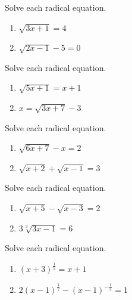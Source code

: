 \documentclass[en,12pt]{elegantbook}
\providecommand{\tightlist}{%
  \setlength{\itemsep}{0pt}\setlength{\parskip}{0pt}}
\providecommand{\tightlist}{%
  \setlength{\itemsep}{0pt}\setlength{\parskip}{0pt}}
\let\BeginKnitrBlock\begin \let\EndKnitrBlock\end
\begin{document}
\BeginKnitrBlock{exercise}
\protect\hypertarget{exr:unnamed-chunk-168}{}{\label{exr:unnamed-chunk-168} }
Solve each radical equation.

\begin{enumerate}
\def\labelenumi{\arabic{enumi}.}
\tightlist
\item
  \(\sqrt{3x+1}=4\)
\item
  \(\sqrt{2x-1}-5=0\)
\end{enumerate}
\EndKnitrBlock{exercise}

\BeginKnitrBlock{exercise}
\protect\hypertarget{exr:unnamed-chunk-169}{}{\label{exr:unnamed-chunk-169} }
Solve each radical equation.

\begin{enumerate}
\def\labelenumi{\arabic{enumi}.}
\tightlist
\item
  \(\sqrt{5x+1}=x+1\)
\item
  \(x=\sqrt{3x+7}-3\)
\end{enumerate}
\EndKnitrBlock{exercise}

\BeginKnitrBlock{exercise}
\protect\hypertarget{exr:unnamed-chunk-170}{}{\label{exr:unnamed-chunk-170} }
Solve each radical equation.

\begin{enumerate}
\def\labelenumi{\arabic{enumi}.}
\tightlist
\item
  \(\sqrt{6x+7}-x=2\)
\item
  \(\sqrt{x+2}+\sqrt{x-1}=3\)
\end{enumerate}
\EndKnitrBlock{exercise}

\BeginKnitrBlock{exercise}
\protect\hypertarget{exr:unnamed-chunk-171}{}{\label{exr:unnamed-chunk-171} }
Solve each radical equation.

\begin{enumerate}
\def\labelenumi{\arabic{enumi}.}
\tightlist
\item
  \(\sqrt{x+5}-\sqrt{x-3}=2\)
\item
  \(3\sqrt[3]{3x-1}=6\)
\end{enumerate}
\EndKnitrBlock{exercise}

\BeginKnitrBlock{exercise}
\protect\hypertarget{exr:unnamed-chunk-172}{}{\label{exr:unnamed-chunk-172} }
Solve each radical equation.

\begin{enumerate}
\def\labelenumi{\arabic{enumi}.}
\tightlist
\item
  \((x+3)^{\frac12}=x+1\)
\item
  \(2(x-1)^{\frac12}-(x-1)^{-\frac12}=1\)
\end{enumerate}
\EndKnitrBlock{exercise}
\end{document}
